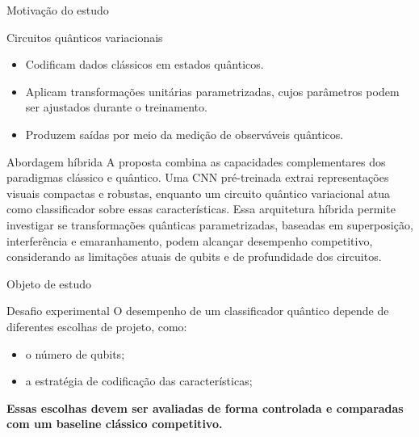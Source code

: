 \begin{frame}{Motivação do estudo}

  \begin{block}{Circuitos quânticos variacionais}
    \begin{itemize}
      \item Codificam dados clássicos em estados quânticos.

      \item Aplicam transformações unitárias parametrizadas, cujos
      parâmetros podem ser ajustados durante o treinamento.
      
      \item Produzem saídas por meio da medição de observáveis quânticos.
    \end{itemize}
  \end{block}
  

  \begin{block}{Abordagem híbrida}
A proposta combina as capacidades complementares dos paradigmas clássico e quântico. Uma CNN pré-treinada extrai representações visuais compactas e robustas, enquanto um circuito quântico variacional atua como classificador sobre essas características. Essa arquitetura híbrida permite investigar se transformações quânticas parametrizadas, baseadas em superposição, interferência e emaranhamento, podem alcançar desempenho competitivo, considerando as limitações atuais de qubits e de profundidade dos circuitos.
\end{block}
  
\end{frame}

\begin{frame}{Objeto de estudo}

\begin{alertblock}{Desafio experimental}
O desempenho de um classificador quântico depende de diferentes escolhas de
projeto, como:
\begin{itemize}
\item o número de qubits;
\item a estratégia de codificação das características;
\end{itemize}
\end{alertblock}

\vspace{0.1cm}

\begin{center}
\textbf{Essas escolhas devem ser avaliadas de forma controlada e comparadas com um baseline clássico competitivo.}
\end{center}

\end{frame}

